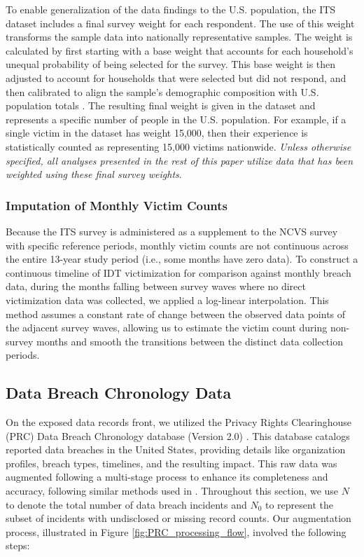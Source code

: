 To enable generalization of the data findings to the U.S. population, the ITS dataset includes a final survey weight for each respondent. The use of this weight transforms the sample data into nationally representative samples. The weight is calculated by first starting with a base weight that accounts for each household's unequal probability of being selected for the survey. This base weight is then adjusted to account for households that were selected but did not respond, and then calibrated to align the sample's demographic composition with U.S. population totals \cite{ICPSR26362, ICPSR34735, ICPSR36044, ICPSR36829, ICPSR37923, ICPSR38501}. The resulting final weight is given in the dataset and represents a specific number of people in the U.S. population. For example, if a single victim in the dataset has weight 15,000, then their experience is statistically counted as representing 15,000 victims nationwide. {\em Unless otherwise specified, all analyses presented in the rest of this paper utilize data that has been weighted using these final survey weights}. 

\subsubsection{Imputation of Monthly Victim Counts} 
\label{sec:ITS_impute}
Because the ITS survey is administered as a supplement to the NCVS survey with specific reference periods, monthly victim counts are not continuous across the entire 13-year study period (i.e., some months have zero data). To construct a continuous timeline of IDT victimization for comparison against monthly breach data, during the months falling between survey waves where no direct victimization data was collected, we applied a log-linear interpolation. This method assumes a constant rate of change between the observed data points of the adjacent survey waves, allowing us to estimate the victim count during non-survey months and smooth the transitions between the distinct data collection periods.


\subsection{Data Breach Chronology Data}
\label{sec:PRC_processing}

On the exposed data records front, we utilized the Privacy Rights Clearinghouse (PRC) Data Breach Chronology database (Version 2.0) \cite{PRC_Chronology}.  This database catalogs reported data breaches in the United States, providing details like organization profiles, breach types, timelines, and the resulting impact. This raw data was augmented following a multi-stage process to enhance its completeness and accuracy, following similar methods used in \cite{Graves2018Should}. Throughout this section, we use $N$ to denote the total number of data breach incidents and $N_0$ to represent the subset of incidents with undisclosed or missing record counts. Our augmentation process, illustrated in Figure \ref{fig:PRC_processing_flow}, involved the following steps:

